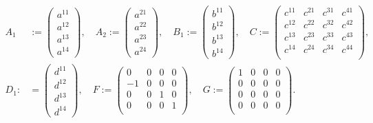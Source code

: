 \begin{equation}
\begin{aligned}
A_1&:=\begin{pmatrix} a^{11}\\a^{12}\\a^{13}\\a^{14} \end{pmatrix}, \quad
A_2:=\begin{pmatrix} a^{21}\\a^{22}\\a^{23}\\a^{24} \end{pmatrix}, \quad
B_1:=\begin{pmatrix} b^{11}\\b^{12}\\b^{13}\\b^{14} \end{pmatrix}, \quad
C:=\begin{pmatrix} 
	c^{11} & c^{21} & c^{31} & c^{41} \\ 
	c^{12} & c^{22} & c^{32} & c^{42} \\ 
	c^{13} & c^{23} & c^{33} & c^{43} \\ 
	c^{14} & c^{24} & c^{34} & c^{44} \\ 
	\end{pmatrix},\\
D_1:&=\begin{pmatrix} d^{11}\\d^{12}\\d^{13}\\d^{14} \end{pmatrix},\quad
F:=\begin{pmatrix} 
	0 & 0 & 0 & 0 \\ 
	-1 & 0 & 0 & 0 \\ 
	0 & 0 & 1 & 0 \\ 
	0 & 0 & 0 & 1 \\ 
   \end{pmatrix}, \quad
G:=\begin{pmatrix} 
	1 & 0 & 0 & 0 \\ 
	0 & 0 & 0 & 0 \\ 
	0 & 0 & 0 & 0 \\ 
	0 & 0 & 0 & 0 \\ 
   \end{pmatrix}.\\
\end{aligned}
\label{eq:tsar:5_2.1}
\end{equation}

